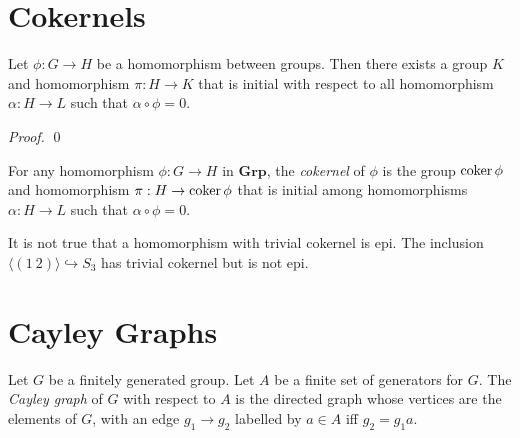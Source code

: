 \section{Cokernels}

\begin{prop}
Let $\phi : G \rightarrow H$ be a homomorphism between groups. Then there exists a group $K$ and homomorphism $\pi : H \rightarrow K$ that is initial with respect to all homomorphism $\alpha : H \rightarrow L$ such that $\alpha \circ \phi = 0$.
\end{prop}

\begin{proof}
\pf
{}
\qed
\end{proof}

\begin{df}[Cokernel]
For any homomorphism $\phi : G \rightarrow H$ in $\mathbf{Grp}$, the \emph{cokernel} of $\phi$ is the group $\operatorname{coker} \phi$ and homomorphism $\pi : H \rightarrow \operatorname{coker} \phi$ that is initial among homomorphisms $\alpha : H \rightarrow L$ such that $\alpha \circ \phi = 0$.
\end{df}

\begin{ex}
It is not true that a homomorphism with trivial cokernel is epi. The inclusion $\langle (1\ 2) \rangle \hookrightarrow S_3$ has trivial cokernel but is not epi.
\end{ex}

\section{Cayley Graphs}

\begin{df}
Let $G$ be a finitely generated group. Let $A$ be a finite set of generators for $G$. The \emph{Cayley graph} of $G$ with respect to $A$ is the directed graph whose vertices are the elements of $G$, with an edge $g_1 \rightarrow g_2$ labelled by $a \in A$ iff $g_2 = g_1 a$.
\end{df}

